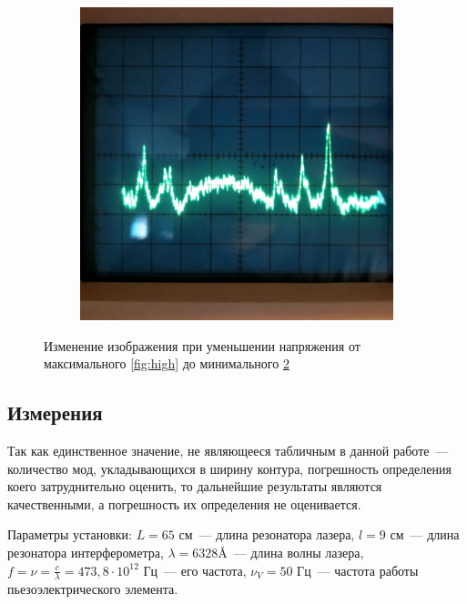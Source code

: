 \begin{figure}[h]
\begin{subfigure}[b]{0.3\textwidth}
         \caption{}
         \label{fig:med}
     \end{subfigure}
     \hfill
     \begin{subfigure}[b]{0.3\textwidth}
         \centering
         \includegraphics[width=\textwidth]{oscLow.jpg}
         \caption{}
         \label{fig:low}
     \end{subfigure}
        \caption{Изменение изображения при уменьшении напряжения от максимального \ref{fig:high} до минимального \ref{fig:low}}
        \label{fig:oscs}
\end{figure}

\subsection{Измерения}
Так как единственное значение, не являющееся табличным в данной работе~--- количество мод, укладывающихся в ширину контура, погрешность определения коего затруднительно оценить, то дальнейшие результаты являются качественными, а погрешность их определения не оценивается.

Параметры установки: $L = 65\text{ см}$~--- длина резонатора лазера, $l = 9\text{ см}$~--- длина резонатора интерферометра, $\lambda = 6328 \si{ \angstrom}$~--- длина волны лазера, $f = \nu = \frac {c}{\lambda} = 473,8 \cdot 10^{12} \text{ Гц}$~--- его частота, $\nu_V = 50 \text{ Гц}$~--- частота работы пьезоэлектрического элемента.


